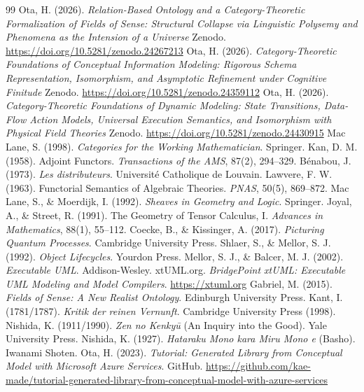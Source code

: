 \documentclass[11pt,a4paper]{ltjsarticle}
\theoremstyle{definition}
\theoremstyle{plain}
\theoremstyle{remark}
\begin{document}
\begin{thebibliography}{99}
 Ota, H. (2026). \emph{Relation-Based Ontology and a Category-Theoretic Formalization of Fields of Sense: Structural Collapse via Linguistic Polysemy and Phenomena as the Intension of a Universe} Zenodo. \url{https://doi.org/10.5281/zenodo.24267213}
 Ota, H. (2026). \emph{Category-Theoretic Foundations of Conceptual Information Modeling: Rigorous Schema Representation, Isomorphism, and Asymptotic Refinement under Cognitive Finitude} Zenodo. \url{https://doi.org/10.5281/zenodo.24359112}
 Ota, H. (2026). \emph{Category-Theoretic Foundations of Dynamic Modeling: State Transitions, Data-Flow Action Models, Universal Execution Semantics, and Isomorphism with Physical Field Theories} Zenodo. \url{https://doi.org/10.5281/zenodo.24430915}
 Mac Lane, S. (1998). \emph{Categories for the Working Mathematician}. Springer.
 Kan, D. M. (1958). Adjoint Functors. \emph{Transactions of the AMS}, 87(2), 294--329.
 B\'enabou, J. (1973). \emph{Les distributeurs}. Universit\'e Catholique de Louvain.
 Lawvere, F. W. (1963). Functorial Semantics of Algebraic Theories. \emph{PNAS}, 50(5), 869--872.
 Mac Lane, S., \& Moerdijk, I. (1992). \emph{Sheaves in Geometry and Logic}. Springer.
 Joyal, A., \& Street, R. (1991). The Geometry of Tensor Calculus, I. \emph{Advances in Mathematics}, 88(1), 55--112.
 Coecke, B., \& Kissinger, A. (2017). \emph{Picturing Quantum Processes}. Cambridge University Press.
 Shlaer, S., \& Mellor, S. J. (1992). \emph{Object Lifecycles}. Yourdon Press.
 Mellor, S. J., \& Balcer, M. J. (2002). \emph{Executable UML}. Addison-Wesley.
 xtUML.org. \emph{BridgePoint xtUML: Executable UML Modeling and Model Compilers}. \url{https://xtuml.org}
 Gabriel, M. (2015). \emph{Fields of Sense: A New Realist Ontology}. Edinburgh University Press.
 Kant, I. (1781/1787). \emph{Kritik der reinen Vernunft}. Cambridge University Press (1998).
 Nishida, K. (1911/1990). \emph{Zen no Kenky\=u} (An Inquiry into the Good). Yale University Press.
 Nishida, K. (1927). \emph{Hataraku Mono kara Miru Mono e} (Basho). Iwanami Shoten.
 Ota, H. (2023). \emph{Tutorial: Generated Library from Conceptual Model with Microsoft Azure Services}. GitHub. \url{https://github.com/kae-made/tutorial-generated-library-from-conceptual-model-with-azure-services}
\end{thebibliography}
\end{document}
